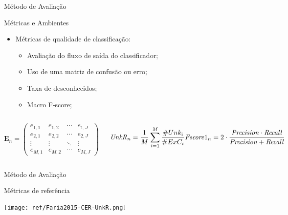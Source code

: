 \documentclass[aspectratio=43,10pt]{beamer}
\begin{document}
\begin{frame}[fragile]{Método de Avaliação}
  \begin{alertblock}{Métricas e Ambientes}
    \begin{itemize}
      \item Métricas de qualidade de classificação:
      \begin{itemize}
        \item Avaliação do fluxo de saída do classificador;
        \item Uso de uma matriz de confusão ou erro;
        \item Taxa de desconhecidos;
        \item Macro F-score;
      \end{itemize}
    \end{itemize}
  \end{alertblock}

  \begin{columns}[T,onlytextwidth]
    \begin{equation*}
      \mathbf{E}_n = \begin{pmatrix}
        e_{1,1} & e_{1,2} & \cdots & e_{1,J} \\
        e_{2,1} & e_{2,2} & \cdots & e_{2,J} \\
        \vdots  & \vdots  & \ddots & \vdots  \\
        e_{M,1} & e_{M,2} & \cdots & e_{M,J} 
      \end{pmatrix}
    \end{equation*}

    
    
    
    \begin{equation*}
        \mathit{UnkR}_n      = \frac{1}{M} \sum_{i=1}^{M} \frac{\#Unk_i}{\#ExC_i} \\
        \mathit{Fscore}1_n   = 2 \cdot \frac{
          \mathit{Precision} \cdot \mathit{Recall}
          }{
            \mathit{Precision} +\mathit{Recall}
          }
    \end{equation*}
  \end{columns}
\end{frame}

\begin{frame}[fragile]{Método de Avaliação}

  Métricas de referência
  \vspace{0.5cm}
  
  \texttt{[image: ref/Faria2015-CER-UnkR.png]}
\end{frame}
\end{document}
